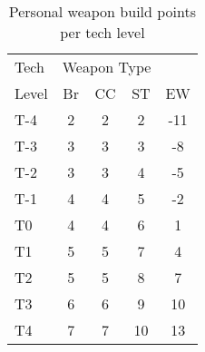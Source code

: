 \begin{table}[ht]
\centering
\begin{tabular}{l*4c}
\toprule
Tech	& \multicolumn{3}{c}{Weapon Type} \\
Level	& Br	& CC	& ST	& EW \\
\midrule
T-4	& 2	& 2	& 2	& -11 \\
T-3	& 3	& 3	& 3	& -8 \\
T-2	& 3	& 3	& 4	& -5 \\
T-1	& 4	& 4	& 5	& -2 \\
T0	& 4	& 4	& 6	& 1 \\
T1	& 5	& 5	& 7	& 4 \\
T2	& 5	& 5	& 8	& 7 \\
T3	& 6	& 6	& 9	& 10 \\
T4	& 7	& 7	& 10	& 13 \\
\bottomrule
\end{tabular}
\caption{Personal weapon build points per tech level}
\label{tab:bp-per-tech-level}
\end{table}
